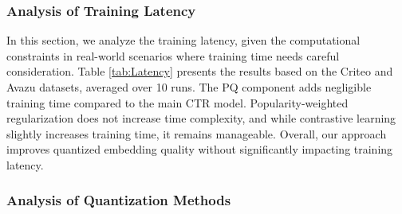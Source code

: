 

\subsubsection{Analysis of Training Latency}
\label{subsub:latency}
In this section, we analyze the training latency, given the computational constraints in real-world scenarios where training time needs careful consideration. 
Table \ref{tab:Latency} presents the results based on the Criteo and Avazu datasets, averaged over 10 runs. The PQ component adds negligible training time compared to the main CTR model. Popularity-weighted regularization does not increase time complexity, and while contrastive learning slightly increases training time, it remains manageable. Overall, our approach improves quantized embedding quality without significantly impacting training latency.


            


\subsubsection{\textbf{Analysis of Quantization Methods}}

